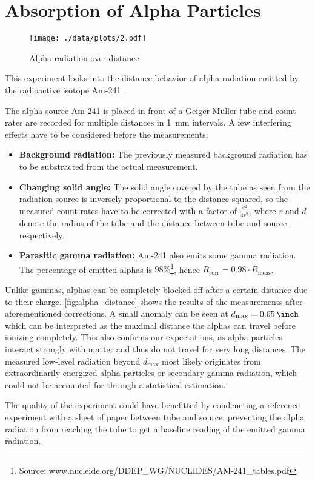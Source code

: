 \chapter{Absorption of Alpha Particles}
\begin{figure}[ht!]
	\centering
	\texttt{[image: ./data/plots/2.pdf]}
	\caption[Alpha radiation over distance]{Alpha radiation over distance}
	\label{fig:alpha_distance}
\end{figure}

This experiment looks into the distance behavior of alpha radiation emitted by the radioactive isotope Am-241.

The alpha-source Am-241 is placed in front of a Geiger-Müller tube and count rates are recorded for multiple distances in \SI{1}{\milli\meter} intervals.
A few interfering effects have to be considered before the measurements:
\begin{itemize}
	\item \textbf{Background radiation:} The previously measured background radiation has to be substracted from the actual measurement.
	\item \textbf{Changing solid angle:} The solid angle covered by the tube as seen from the radiation source is inversely proportional to the distance squared, so the measured count rates have to be corrected with a factor of $\frac{d^2}{4r^2}$, where $r$ and $d$ denote the radius of the tube and the distance between tube and source respectively.
	\item \textbf{Parasitic gamma radiation:} Am-241 also emits some gamma radiation. The percentage of emitted alphas is $\num{98}\%$\footnote{Source: www.nucleide.org/DDEP\_WG/NUCLIDES/AM-241\_tables.pdf}, hence $R_\text{corr}=0.98\cdot R_\text{meas}$.
\end{itemize}

Unlike gammas, alphas can be completely blocked off after a certain distance due to their charge.
\autoref{fig:alpha_distance} shows the results of the measurements after aforementioned corrections.
A small anomaly can be seen at $d_\text{max}=\SI{0.65}{\inch}$ which can be interpreted as the maximal distance the alphas can travel before ionizing completely.
This also confirms our expectations, as alpha particles interact strongly with matter and thus do not travel for very long distances.
The measured low-level radiation beyond $d_\text{max}$ most likely originates from extraordinarily energized alpha particles or secondary gamma radiation, which could not be accounted for through a statistical estimation.

The quality of the experiment could have benefitted by condcucting a reference experiment with a sheet of paper between tube and source, preventing the alpha radiation from reaching the tube to get a baseline reading of the emitted gamma radiation.

